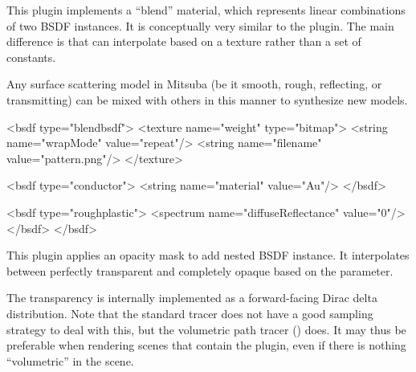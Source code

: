 
This plugin implements a ``blend'' material, which represents
linear combinations of two BSDF instances. It is conceptually very similar
to the  plugin. The main difference is that
 can interpolate based on a texture rather than a set
of constants.

Any surface scattering model in Mitsuba (be it smooth, rough, reflecting, or
transmitting) can be mixed with others in this manner to synthesize new models.

\begin{xml}[caption=Description of the material shown above,
    label=lst:blendbsdf]
<bsdf type="blendbsdf">
    <texture name="weight" type="bitmap">
        <string name="wrapMode" value="repeat"/>
        <string name="filename" value="pattern.png"/>
    </texture>

    <bsdf type="conductor">
        <string name="material" value="Au"/>
    </bsdf>

    <bsdf type="roughplastic">
        <spectrum name="diffuseReflectance" value="0"/>
    </bsdf>
</bsdf>
\end{xml}
This plugin applies an opacity mask to add nested BSDF instance. It interpolates
between perfectly transparent and completely opaque based on the 
parameter.

The transparency is internally implemented as a forward-facing Dirac delta distribution.
Note that the standard  tracer does not have a good
sampling strategy to deal with this, but the volumetric path tracer
() does. It may thus be preferable when rendering scenes
that contain the  plugin, even if there is nothing
``volumetric'' in the scene.
\vspace{5mm}

